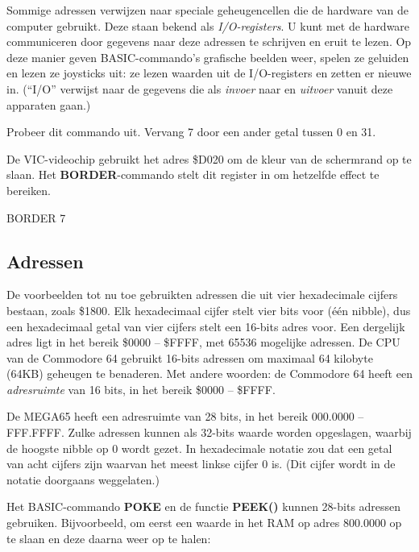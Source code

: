 Sommige adressen verwijzen naar speciale geheugencellen die de hardware van de computer gebruikt. Deze staan bekend als {\em I/O-registers}. U kunt met de hardware communiceren door gegevens naar deze adressen te schrijven en eruit te lezen. Op deze manier geven BASIC-commando's grafische beelden weer, spelen ze geluiden en lezen ze joysticks uit: ze lezen waarden uit de I/O-registers en zetten er nieuwe in. (``I/O'' verwijst naar de gegevens die als \emph{invoer} naar en \emph{uitvoer} vanuit deze apparaten gaan.)

Probeer dit commando uit. Vervang 7 door een ander getal tussen 0 en 31.


De VIC-videochip gebruikt het adres \$D020 om de kleur van de schermrand op te slaan. Het {\bf BORDER}-commando stelt dit register in om hetzelfde effect te bereiken.

\begin{basiccode}
BORDER 7
\end{basiccode}

\subsection{Adressen}

De voorbeelden tot nu toe gebruikten adressen die uit vier hexadecimale cijfers bestaan, zoals \$1800. Elk hexadecimaal cijfer stelt vier bits voor (één nibble), dus een hexadecimaal getal van vier cijfers stelt een 16-bits adres voor. Een dergelijk adres ligt in het bereik \$0000 -- \$FFFF, met 65536 mogelijke adressen. De CPU van de Commodore 64 gebruikt 16-bits adressen om maximaal 64 kilobyte (64KB) geheugen te benaderen. Met andere woorden: de Commodore 64 heeft een \emph{adresruimte} van 16 bits, in het bereik \$0000 -- \$FFFF.

De MEGA65 heeft een adresruimte van 28 bits, in het bereik 000.0000 -- FFF.FFFF. Zulke adressen kunnen als 32-bits waarde worden opgeslagen, waarbij de hoogste nibble op 0 wordt gezet. In hexadecimale notatie zou dat een getal van acht cijfers zijn waarvan het meest linkse cijfer 0 is. (Dit cijfer wordt in de notatie doorgaans weggelaten.)

Het BASIC-commando {\bf POKE} en de functie {\bf PEEK()} kunnen 28-bits adressen gebruiken. Bijvoorbeeld, om eerst een waarde in het RAM op adres 800.0000 op te slaan en deze daarna weer op te halen:


